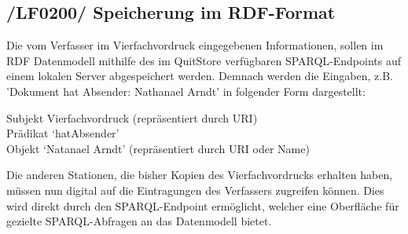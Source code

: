 \subsection{/LF0200/ Speicherung im RDF-Format}
Die vom Verfasser im Vierfachvordruck eingegebenen Informationen, sollen im RDF Datenmodell mithilfe des im QuitStore verfügbaren SPARQL-Endpoints auf einem lokalen Server abgespeichert werden. Demnach werden die Eingaben, z.B. 'Dokument hat Absender: Nathanael Arndt' in folgender Form dargestellt:
\begin{flushleft}
\quad \quad \quad Subjekt Vierfachvordruck (repräsentiert durch URI) \\
\quad \quad \quad Prädikat `hatAbsender' \\
\quad \quad \quad Objekt `Natanael Arndt' (repräsentiert durch URI oder Name)
\end{flushleft}
Die anderen Stationen, die bisher Kopien des Vierfachvordrucks erhalten haben, müssen nun digital auf die Eintragungen des Verfassers zugreifen können. Dies wird direkt durch den SPARQL-Endpoint ermöglicht, welcher eine Oberfläche für gezielte SPARQL-Abfragen an das Datenmodell bietet.